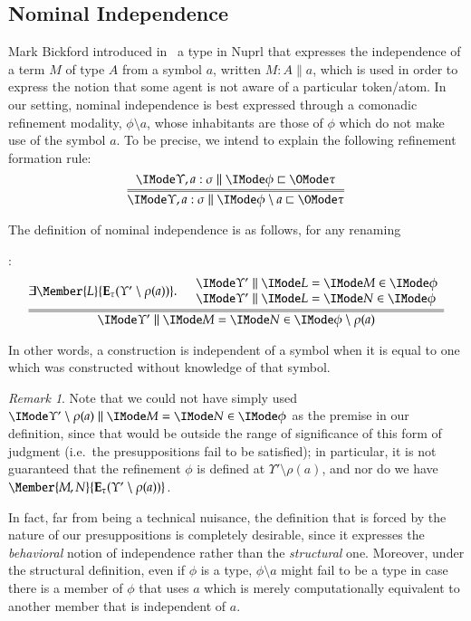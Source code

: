 \documentclass[11pt]{article}
\theoremstyle{definition}
\theoremstyle{notation}
\theoremstyle{remark}
\newtheorem{remark}[thm]{Remark}
\numberwithin{equation}{section}
\newcommand\Exprs{\mathbf{E}}
\begin{document}
\subsection{Nominal Independence}

\newcommand\Indep[2]{#1\setminus #2}

Mark Bickford introduced in~\cite{bickford:2008} a type in Nuprl that expresses
the independence of a term $M$ of type $A$ from a symbol $a$, written
$M:A\parallel a$, which is used in order to express the notion that some agent
is not aware of a particular token/atom. In our setting, nominal independence
is best expressed through a comonadic refinement modality, $\Indep{\phi}{a}$, whose
inhabitants are those of $\phi$ which do not make use of the symbol
$a$. To be precise, we intend to explain the following refinement formation
rule:
\[
  \infer={
    \Refines{\Upsilon,a:\sigma}{\Indep{\phi}{a}}{\tau}
  }{
    \Refines{\Upsilon,a:\sigma}{\phi}{\tau}
  }
\]

The definition of nominal independence is as follows, for any renaming
%
:
\[
  \infer={
    \RMemEq{\Upsilon'}{M}{N}{\Indep{\phi}{\rho(a)}}
  }{
    \exists\Member{L}{\Exprs_\tau(\Upsilon'\setminus \rho(a))}.
    \begin{array}{l}
      \quad \RMemEq{\Upsilon'}{L}{M}{\phi}\\
      \quad \RMemEq{\Upsilon'}{L}{N}{\phi}
    \end{array}
  }
\]

In other words, a construction is independent of a symbol when it is equal to
one which was constructed without knowledge of that symbol.

\begin{remark}
  Note that we could not have simply used
  $\RMemEq{\Upsilon'\setminus\rho(a)}{M}{N}{\phi}$ as the premise in our
  definition, since that would be outside the range of significance of this
  form of judgment (i.e.\ the presuppositions fail to be satisfied); in
  particular, it is not guaranteed that the refinement $\phi$ is defined at
  $\Upsilon'\setminus\rho(a)$, and nor do we have
  $\Member{M,N}{\Exprs_\tau(\Upsilon'\setminus\rho(a))}$.

  In fact, far from being a technical nuisance, the definition that is forced
  by the nature of our presuppositions is completely desirable, since it
  expresses the \emph{behavioral} notion of independence rather than the
  \emph{structural} one. Moreover, under the structural definition, even if
  $\phi$ is a type, $\phi\setminus a$ might fail to be a type in case there is
  a member of $\phi$ that uses $a$ which is merely computationally equivalent
  to another member that is independent of $a$.
\end{remark}
\end{document}
